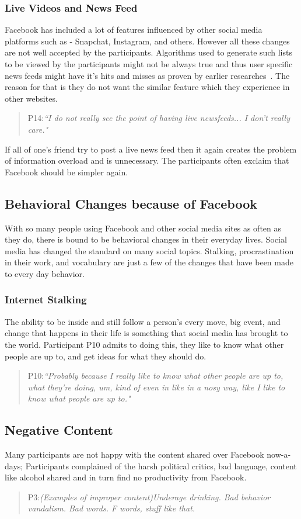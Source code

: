 \subsubsection{Live Videos and News Feed}
Facebook has included a lot of features influenced by other social media platforms such as - Snapchat, Instagram, and others. However all these changes are not well accepted by the participants. Algorithms used to generate such lists to be viewed by the participants might not be always true and thus user specific news feeds might have it's hits and misses as proven by earlier researches~\cite{gillespie2011can}. The reason for that is they do not want the similar feature which they experience in other websites. 
\begin{quote}
P14:\textit{``I do not really see the point of having live newsfeeds... I don't really care."}
\end{quote}
If all of one's friend try to post a live news feed then it again creates the problem of information overload and is unnecessary. The participants often exclaim that Facebook should be simpler again.

\subsection{Behavioral Changes because of Facebook}
With so many people using Facebook and other social media sites as often as they do, there is bound to be behavioral changes in their everyday lives. Social media has changed the standard on many social topics. Stalking, procrastination in their work, and vocabulary are just a few of the changes that have been made to every day behavior.

\subsubsection{Internet Stalking}
The ability to be inside and still follow a person's every move, big event, and change that happens in their life is something that social media has brought to the world. Participant P10 admits to doing this, they like to know what other people are up to, and get ideas for what they should do.
\begin{quote}
P10:\textit{``Probably because I really like to know what other people are up to, what they're doing, um, kind of even in like in a nosy way, like I like to know what people are up to."}
\end{quote}

\subsection{Negative Content}
Many participants are not happy with the content shared over Facebook now-a-days; Participants complained of the harsh political critics, bad language, content like alcohol shared and in turn find no productivity from Facebook.
\begin{quote}
P3:\textit{(Examples of improper content)Underage drinking. Bad behavior vandalism. Bad words. F words, stuff like that.}
\end{quote}

